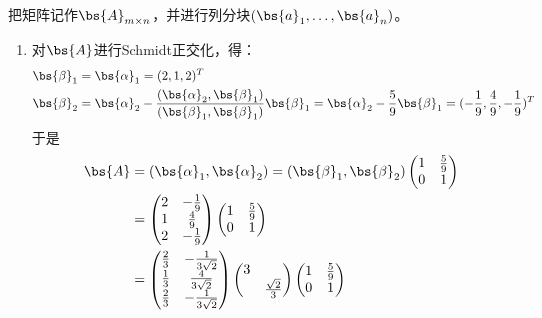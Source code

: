 \documentclass[12pt, a4paper, oneside, UTF8]{ctexbook}
\begin{document}
\begin{solution}
    把矩阵记作$\bs{A}_{m\times n}$，并进行列分块$(\bs{a}_1,\ldots,\bs{a}_n)$。
    \begin{enumerate}[label=(\arabic*)]
        \item 对$\bs{A}$进行Schmidt正交化，得：
        \begin{align*}
            \bs{\beta}_1&=\bs{\alpha}_1=(2,1,2)^T \\
            \bs{\beta}_2&=\bs{\alpha}_2-\frac{(\bs{\alpha}_2,\bs{\beta}_1)}{(\bs{\beta}_1,\bs{\beta}_1)}\bs{\beta}_1
            =\bs{\alpha}_2-\frac{5}{9}\bs{\beta}_1=
            (-\frac{1}{9},\frac{4}{9},-\frac{1}{9})^T
        \end{align*}
        于是
        \begin{align*}
            \bs{A}&
            =(\bs{\alpha}_1,\bs{\alpha}_2)=(\bs{\beta}_1,\bs{\beta}_2)\begin{pmatrix}
                1 &\frac{5}{9}\\
                0 & 1
            \end{pmatrix}\\
            &=\begin{pmatrix}
                2& -\frac{1}{9}\\
                1& \frac{4}{9}\\
                2&-\frac{1}{9}
            \end{pmatrix}
                \begin{pmatrix}
                1 &\frac{5}{9}\\
                0 & 1
            \end{pmatrix}\\
            &=\begin{pmatrix}
                \frac{2}{3}& -\frac{1}{3\sqrt{2}}\\
                \frac{1}{3}& \frac{4}{3\sqrt{2}}\\
                \frac{2}{3}&-\frac{1}{3\sqrt{2}}
            \end{pmatrix}
            \begin{pmatrix}
                3 & \\
                & \frac{\sqrt{2}}{3}
            \end{pmatrix}
                \begin{pmatrix}
                1 &\frac{5}{9}\\
                0 & 1
            \end{pmatrix}\\

\end{align*}
\end{enumerate}
\end{solution}
\end{document}
